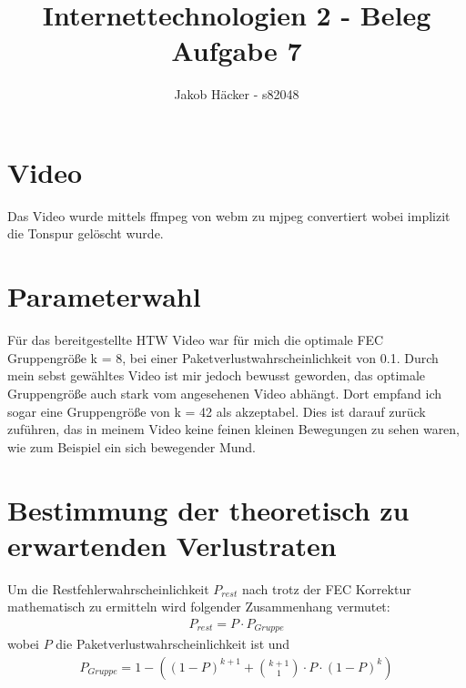 \documentclass{article}
\begin{document}
\title{Internettechnologien 2 - Beleg Aufgabe 7}
\author{Jakob Häcker - s82048}
\date{}

\begin{titlepage}
   \maketitle
\end{titlepage}

\newpage
    \section{Video}
        Das Video wurde mittels ffmpeg von webm zu mjpeg convertiert wobei implizit die Tonspur gelöscht wurde.
    \section{Parameterwahl}
        Für das bereitgestellte HTW Video war für mich die optimale FEC Gruppengröße k = 8, bei einer Paketverlustwahrscheinlichkeit von 0.1.
        Durch mein sebst gewähltes Video ist mir jedoch bewusst geworden, das optimale Gruppengröße auch stark vom angesehenen Video abhängt.
        Dort empfand ich sogar eine Gruppengröße von k = 42 als akzeptabel.
        Dies ist darauf zurück zuführen, das in meinem Video keine feinen kleinen Bewegungen zu sehen waren, wie zum Beispiel ein sich bewegender Mund.
    \section{Bestimmung der theoretisch zu erwartenden Verlustraten}
        Um die Restfehlerwahrscheinlichkeit $P_{rest}$ nach trotz der FEC Korrektur mathematisch zu ermitteln wird folgender Zusammenhang vermutet:
            \begin{align*}
                P_{rest} = P \cdot P_{Gruppe}
            \end{align*}
        wobei $P$ die Paketverlustwahrscheinlichkeit ist und 
            \begin{align*}
                P_{Gruppe} = 1 - \left((1-P)^{k+1} + \binom{k+1}{1} \cdot P \cdot (1-P)^k \right)
            \end{align*}
\end{document}
